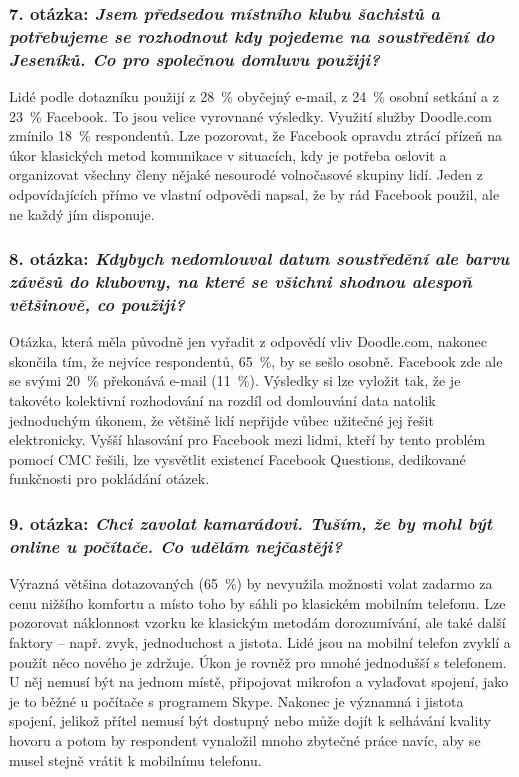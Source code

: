 \documentclass[12pt,oneside,final]{fithesis2}
\begin{document}
\subsubsection*{\textbf{7. otázka:} \emph{Jsem předsedou místního klubu šachistů a potřebujeme se rozhodnout kdy pojedeme na soustředění do Jeseníků. Co pro společnou domluvu použiji?}}
Lidé podle dotazníku použijí z 28~\% obyčejný e-mail, z 24~\% osobní setkání a z 23~\% Facebook. To jsou velice vyrovnané výsledky. Využití služby Doodle.com zmínilo 18~\% respondentů. Lze pozorovat, že Facebook opravdu ztrácí přízeň na úkor klasických metod komunikace v situacích, kdy je potřeba oslovit a organizovat všechny členy nějaké nesourodé volnočasové skupiny lidí. Jeden z odpovídajících přímo ve vlastní odpovědi napsal, že by rád Facebook použil, ale ne každý jím disponuje.

\subsubsection*{\textbf{8. otázka:} \emph{Kdybych nedomlouval datum soustředění ale barvu závěsů do klubovny, na které se všichni shodnou alespoň většinově, co použiji?}}
Otázka, která měla původně jen vyřadit z odpovědí vliv Doodle.com, nakonec skončila tím, že nejvíce respondentů, 65~\%, by se sešlo osobně. Facebook zde ale se svými 20~\% překonává e-mail (11~\%). Výsledky si lze vyložit tak, že je takovéto kolektivní rozhodování na rozdíl od domlouvání data natolik jednoduchým úkonem, že většině lidí nepřijde vůbec užitečné jej řešit elektronicky. Vyšší hlasování pro Facebook mezi lidmi, kteří by tento problém pomocí CMC řešili, lze vysvětlit existencí Facebook Questions, dedikované funkčnosti pro pokládání otázek.

\subsubsection*{\textbf{9. otázka:} \emph{Chci zavolat kamarádovi. Tuším, že by mohl být online u počítače. Co udělám nejčastěji?}}
Výrazná většina dotazovaných (65~\%) by nevyužila možnosti volat zadarmo za cenu nižšího komfortu a místo toho by sáhli po klasickém mobilním telefonu. Lze pozorovat náklonnost vzorku ke klasickým metodám dorozumívání, ale také další faktory -- např. zvyk, jednoduchost a jistota. Lidé jsou na mobilní telefon zvyklí a použít něco nového je zdržuje. Úkon je rovněž pro mnohé jednodušší s telefonem. U něj nemusí být na jednom místě, připojovat mikrofon a vylaďovat spojení, jako je to běžné u počítače s programem Skype. Nakonec je významná i jistota spojení, jelikož přítel nemusí být dostupný nebo může dojít k selhávání kvality hovoru a potom by respondent vynaložil mnoho zbytečné práce navíc, aby se musel stejně vrátit k mobilnímu telefonu.
\end{document}
